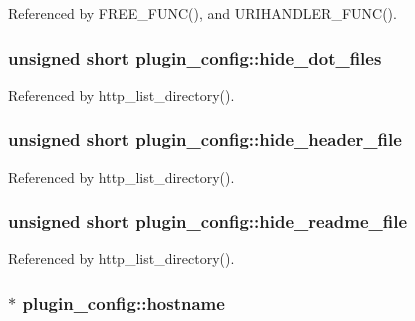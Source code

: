 Referenced by F\-R\-E\-E\-\_\-\-F\-U\-N\-C(), and U\-R\-I\-H\-A\-N\-D\-L\-E\-R\-\_\-\-F\-U\-N\-C().

\hypertarget{structplugin__config_ae22fc24e78563e179fc8f5c5d66908d8}{
\subsubsection[{hide\-\_\-dot\-\_\-files}]{\setlength{\rightskip}{0pt plus 5cm}unsigned short plugin\-\_\-config\-::hide\-\_\-dot\-\_\-files}}\label{structplugin__config_ae22fc24e78563e179fc8f5c5d66908d8}


Referenced by http\-\_\-list\-\_\-directory().

\hypertarget{structplugin__config_a20efae724b908d84708092c243bdbfec}{
\subsubsection[{hide\-\_\-header\-\_\-file}]{\setlength{\rightskip}{0pt plus 5cm}unsigned short plugin\-\_\-config\-::hide\-\_\-header\-\_\-file}}\label{structplugin__config_a20efae724b908d84708092c243bdbfec}


Referenced by http\-\_\-list\-\_\-directory().

\hypertarget{structplugin__config_a7e495d4e5ef0b6cbe7f89c8f0051344a}{
\subsubsection[{hide\-\_\-readme\-\_\-file}]{\setlength{\rightskip}{0pt plus 5cm}unsigned short plugin\-\_\-config\-::hide\-\_\-readme\-\_\-file}}\label{structplugin__config_a7e495d4e5ef0b6cbe7f89c8f0051344a}


Referenced by http\-\_\-list\-\_\-directory().

\hypertarget{structplugin__config_a57500ea3accab4f7a7081b69508b6969}{
\subsubsection[{hostname}]{$\ast$ plugin\-\_\-config\-::hostname}}\label{structplugin__config_a57500ea3accab4f7a7081b69508b6969}


